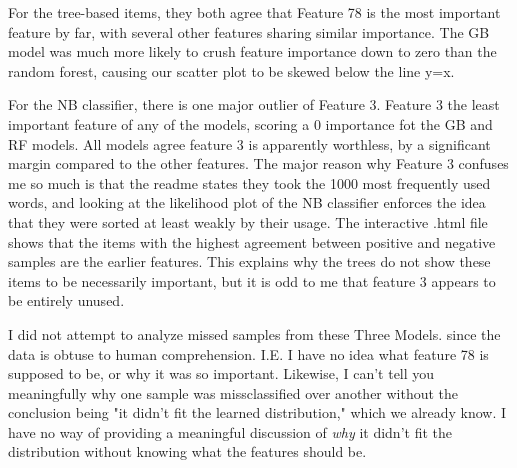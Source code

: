 \documentclass[12pt]{article}
\begin{document}
For the tree-based items, they both agree that Feature 78 is the most important feature by far, with several other features
sharing similar importance. The GB model was much more likely to crush feature importance down to zero than the random 
forest, causing our scatter plot to be skewed below the line y=x. 

For the NB classifier, there is one major outlier of Feature 3. Feature 3 the least important feature of any 
of the models, scoring a 0 importance fot the GB and RF models. All models agree feature 3 is apparently worthless, by a
significant margin compared to the other features. The major reason why Feature 3 confuses me so much is that the 
readme states they took the 1000 most frequently used words, and looking at the likelihood plot of the NB classifier 
enforces the idea that they were sorted at least weakly by their usage. The interactive .html file shows that the 
items with the highest agreement between positive and negative samples are the earlier features. This explains 
why the trees do not show these items to be necessarily important, but it is odd to me that feature 3 appears to be 
entirely unused.

I did not attempt to analyze missed samples from these Three Models. since the data is obtuse to human comprehension. I.E.
I have no idea what feature 78 is supposed to be, or why it was so important. Likewise, I can't tell you meaningfully why 
one sample was missclassified over another without the conclusion being "it didn't fit the learned distribution," which 
we already know. I have no way of providing a meaningful discussion of \emph{why} it didn't fit the distribution without 
knowing what the features should be.
\end{document}

